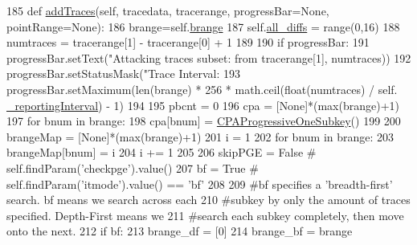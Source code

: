 \begin{DoxyCode}
185     \textcolor{keyword}{def }\hyperlink{classsoftware_1_1chipwhisperer_1_1analyzer_1_1attacks_1_1cpa__algorithms_1_1progressive_1_1CPAProgressive_a55f67eea78a588daf4ac0793915f62ae}{addTraces}(self, tracedata, tracerange, progressBar=None, pointRange=None):
186         brange=self.\hyperlink{classsoftware_1_1chipwhisperer_1_1analyzer_1_1attacks_1_1cpa__algorithms_1_1progressive_1_1CPAProgressive_a66c873c10645a405c0994acd78cb4026}{brange}
187         self.\hyperlink{classsoftware_1_1chipwhisperer_1_1analyzer_1_1attacks_1_1cpa__algorithms_1_1progressive_1_1CPAProgressive_abec0da0ad8394176108af5d773b02687}{all\_diffs} = range(0,16)
188         numtraces = tracerange[1] - tracerange[0] + 1
189 
190         \textcolor{keywordflow}{if} progressBar:
191             progressBar.setText(\textcolor{stringliteral}{"Attacking traces subset: from %
      tracerange[1], numtraces))
192             progressBar.setStatusMask(\textcolor{stringliteral}{"Trace Interval: %
193             progressBar.setMaximum(len(brange) * 256 * math.ceil(float(numtraces) / self.
      \hyperlink{classsoftware_1_1chipwhisperer_1_1analyzer_1_1attacks_1_1cpa__algorithms_1_1progressive_1_1CPAProgressive_ad829dac993aa00e8aecef66d5ff0f542}{\_reportingInterval}) - 1)
194 
195         pbcnt = 0
196         cpa = [\textcolor{keywordtype}{None}]*(max(brange)+1)
197         \textcolor{keywordflow}{for} bnum \textcolor{keywordflow}{in} brange:
198             cpa[bnum] = \hyperlink{classsoftware_1_1chipwhisperer_1_1analyzer_1_1attacks_1_1cpa__algorithms_1_1progressive_1_1CPAProgressiveOneSubkey}{CPAProgressiveOneSubkey}()
199 
200         brangeMap = [\textcolor{keywordtype}{None}]*(max(brange)+1)
201         i = 1
202         \textcolor{keywordflow}{for} bnum \textcolor{keywordflow}{in} brange:
203             brangeMap[bnum] = i
204             i += 1
205 
206         skipPGE = \textcolor{keyword}{False}  \textcolor{comment}{# self.findParam('checkpge').value()}
207         bf = \textcolor{keyword}{True}  \textcolor{comment}{# self.findParam('itmode').value() == 'bf'}
208 
209         \textcolor{comment}{#bf specifies a 'breadth-first' search. bf means we search across each}
210         \textcolor{comment}{#subkey by only the amount of traces specified. Depth-First means we}
211         \textcolor{comment}{#search each subkey completely, then move onto the next.}
212         \textcolor{keywordflow}{if} bf:
213             brange\_df = [0]
214             brange\_bf = brange
}}
\end{DoxyCode}
